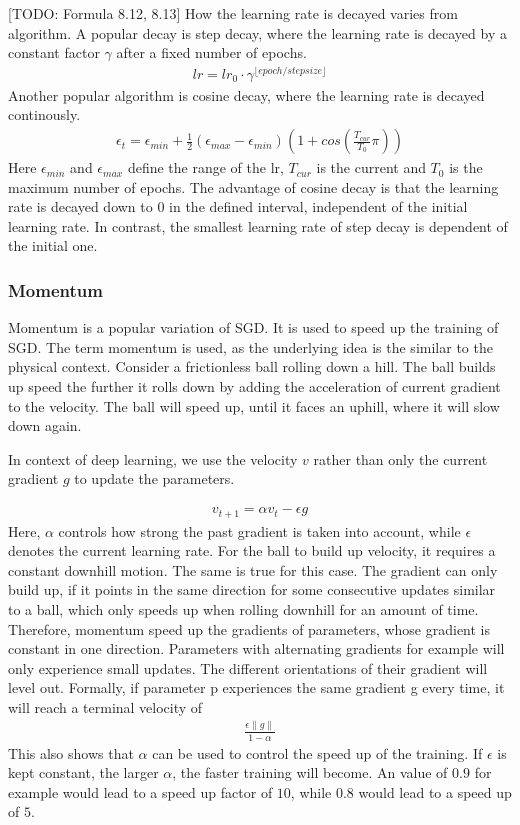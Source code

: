 [TODO: Formula 8.12, 8.13] How the learning rate is decayed varies from
algorithm. A popular decay is step decay, where the learning rate is decayed by
a constant factor $\gamma$ after a fixed number of epochs.
\begin{align}
    lr = lr_0 \cdot \gamma^{\lfloor epoch/stepsize \rfloor}
\end{align}
Another popular algorithm is cosine decay, where the learning rate is decayed
continously.
\begin{align}\label{eq:cosine_decay}
    \epsilon_t = \epsilon_{min} + \frac{1}{2} (\epsilon_{max} - \epsilon_{min})(1+cos(\frac{T_{cur}}{T_0}\pi))
\end{align}
Here $\epsilon_{min}$ and $\epsilon_{max}$ define the range of the lr, $T_{cur}$
is the current and $T_0$ is the maximum number of epochs. The advantage of
cosine decay is that the learning rate is decayed down to 0 in the defined
interval, independent of the initial learning rate. In contrast, the smallest
learning rate of step decay is dependent of the initial  one.

\subsubsection{Momentum}\label{sub:Momentum}
Momentum is a popular variation of SGD. It is used to speed up the training of
SGD. The term momentum is used, as the underlying idea is the similar to the
physical context. Consider a frictionless ball rolling down a hill. The ball
builds up speed the further it rolls down by adding the acceleration of current
gradient to the velocity. The ball will speed up, until it faces an uphill,
where it will slow down again.

In context of deep learning, we use the velocity $v$ rather than only the
current gradient $g$ to update the parameters.

\begin{align}
    v_{t+1}=\alpha v_t - \epsilon g
\end{align}
Here, $\alpha$ controls how strong the past gradient is taken into account,
while $\epsilon$ denotes the current learning rate. For the ball to build up
velocity, it requires a constant downhill motion. The same is true for this
case. The gradient can only build up, if it points in the same direction for
some consecutive updates similar to a ball, which only speeds up when rolling
downhill for an amount of time. Therefore, momentum speed up the gradients of
parameters, whose gradient is constant in one direction. Parameters with
alternating gradients for example will only experience small updates. The
different orientations of their gradient will level out. Formally, if parameter
p experiences the same gradient g every time, it will reach a terminal velocity
of
\begin{align}
    \frac{\epsilon \lVert g \rVert}{1-\alpha}
\end{align}
This also shows that $\alpha$ can be used to control the speed up of the
training. If $\epsilon$ is kept constant, the larger $\alpha$, the faster
training will become. An value of $0.9$ for example would lead to a speed up
factor of $10$, while $0.8$ would lead to a speed up of $5$.

